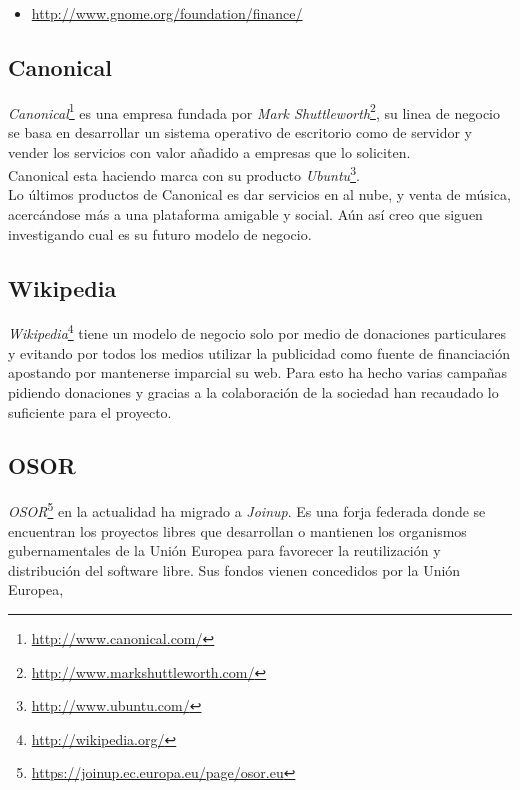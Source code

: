 \documentclass[12pt]{article} %
\begin{document}
\begin{itemize}
	\item \url{http://www.gnome.org/foundation/finance/}
\end{itemize}

\subsection{Canonical} %

\emph{Canonical}\footnote{\url{http://www.canonical.com/}} es una empresa fundada por \emph{Mark Shuttleworth}\footnote{\url{http://www.markshuttleworth.com/}}, su linea de negocio se basa en desarrollar un sistema operativo de escritorio como de servidor y vender los servicios con valor añadido a empresas que lo soliciten.\\Canonical esta haciendo marca con su producto \emph{Ubuntu}\footnote{\url{http://www.ubuntu.com/}}.\\Lo últimos productos de Canonical es dar servicios en al nube, y venta de música, acercándose más a una plataforma amigable y social. Aún así creo que siguen investigando cual es su futuro modelo de negocio.
\subsection{Wikipedia} %

\emph{Wikipedia}\footnote{\url{http://wikipedia.org/}} tiene un modelo de negocio solo por medio de donaciones particulares y evitando por todos los medios utilizar la publicidad como fuente de financiación  apostando por mantenerse imparcial su web. Para esto ha hecho varias campañas pidiendo donaciones y gracias a la colaboración de la sociedad han recaudado lo suficiente para el proyecto.

\subsection{OSOR} %

\emph{OSOR}\footnote{\url{https://joinup.ec.europa.eu/page/osor.eu}} en la actualidad ha migrado a \emph{Joinup}. Es una forja federada donde se encuentran los proyectos libres que desarrollan o mantienen los organismos gubernamentales de la Unión Europea para favorecer la reutilización y distribución del software libre. Sus fondos vienen concedidos por la Unión Europea, 
\end{document}
